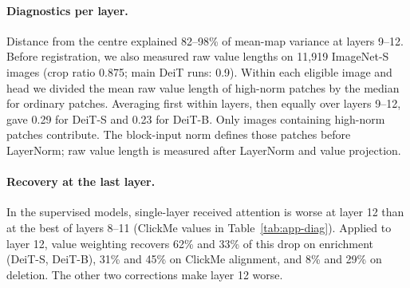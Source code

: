 \paragraph{Diagnostics per layer.} Distance from the centre explained 82--98\% of mean-map variance at layers 9--12. Before registration, we also measured raw value lengths on 11,919 ImageNet-S images (crop ratio 0.875; main DeiT runs: 0.9). Within each eligible image and head we divided the mean raw value length of high-norm patches by the median for ordinary patches. Averaging first within layers, then equally over layers 9--12, gave 0.29 for DeiT-S and 0.23 for DeiT-B. Only images containing high-norm patches contribute. The block-input norm defines those patches before LayerNorm; raw value length is measured after LayerNorm and value projection.

\paragraph{Recovery at the last layer.} In the supervised models, single-layer received attention is worse at layer 12 than at the best of layers 8--11 (ClickMe values in Table~\ref{tab:app-diag}). Applied to layer 12, value weighting recovers 62\% and 33\% of this drop on enrichment (DeiT-S, DeiT-B), 31\% and 45\% on ClickMe alignment, and 8\% and 29\% on deletion. The other two corrections make layer 12 worse.

\begin{table}[!htbp]
\caption{Per-layer diagnostics (Fig.~\ref{fig:diag}a--c: ImageNet-S for the mean-map and high-norm shares; 2,000 held-out images for probe accuracy) and uncorrected ClickMe alignment (last three columns). S, B, D: DeiT-S, DeiT-B, DINO ViT-S; probe chance: 0.5\%. Values are rounded; DINO layers 9--12 have exactly zero high-norm attention on this dataset.}
\label{tab:app-diag}
\centering

\end{table}

\begin{table}[!tbp]
\caption{Paired differences, layers 9--12: mean, 95\% image-bootstrap interval and verdict (\textit{h}/\textit{c}/\textit{l}: higher/comparable/lower). Margins: 0.02 (enrichment/ClickMe), 0.05 (deletion); intervals unadjusted. Samples: App.~\ref{app:setup}. Top: each change (descriptive) and their combination (primary) versus received attention. Bottom: each change versus its matched control (primary). Registered negative controls are also discussed in App.~\ref{app:setup}.}
\label{tab:app-paired}
\centering

\end{table}

